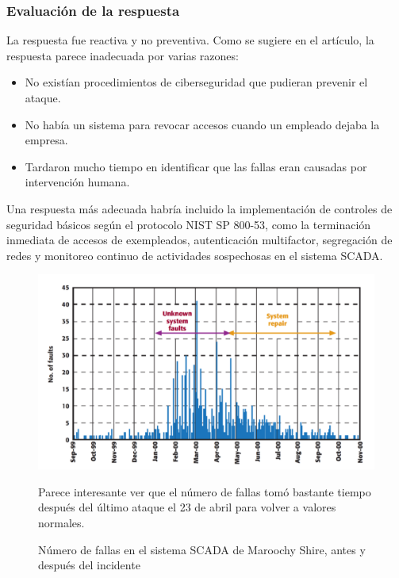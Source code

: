 \subsubsection{Evaluación de la respuesta}

\begin{paracol}{2}
    \colfill
    
    La respuesta fue reactiva y no preventiva. Como se sugiere en el artículo, la respuesta parece inadecuada por varias razones:
    
    \begin{itemize}
        \item No existían procedimientos de ciberseguridad que pudieran prevenir el ataque.
        \item No había un sistema para revocar accesos cuando un empleado dejaba la empresa.
        \item Tardaron mucho tiempo en identificar que las fallas eran causadas por intervención humana.
    \end{itemize}
    
    Una respuesta más adecuada habría incluido la implementación de controles de seguridad básicos según el protocolo NIST SP 800-53, como la terminación inmediata de accesos de exempleados, autenticación multifactor, segregación de redes y monitoreo continuo de actividades sospechosas en el sistema \textsc{SCADA}.
    \colfill

    \switchcolumn

    \begin{figure}[htbp]
        \centering
            \includegraphics[width=1\columnwidth]{images/maroochyFaults.png}
            \caption{Número de fallas en el sistema \textsc{SCADA} de Maroochy Shire, antes y después del incidente}
            \label{fig:maroochyFaults}

            Parece interesante ver que el número de fallas tomó bastante tiempo después del último ataque el 23 de abril para volver a valores normales.
    \end{figure}

\end{paracol}




